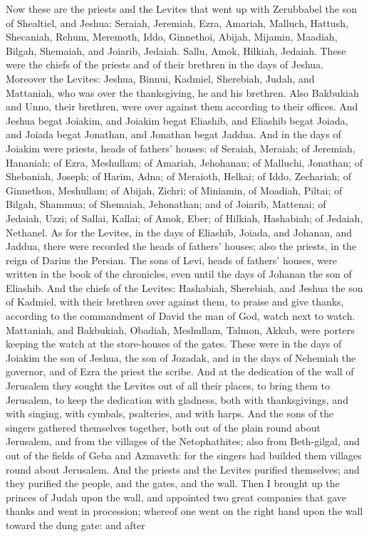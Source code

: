 Now these are the priests and the Levites that went up with Zerubbabel the son of Shealtiel, and Jeshua: Seraiah, Jeremiah, Ezra, Amariah, Malluch, Hattush, Shecaniah, Rehum, Meremoth, Iddo, Ginnethoi, Abijah, Mijamin, Maadiah, Bilgah, Shemaiah, and Joiarib, Jedaiah. Sallu, Amok, Hilkiah, Jedaiah. These were the chiefs of the priests and of their brethren in the days of Jeshua.  Moreover the Levites: Jeshua, Binnui, Kadmiel, Sherebiah, Judah, and Mattaniah, who was over the thanksgiving, he and his brethren. Also Bakbukiah and Unno, their brethren, were over against them according to their offices. And Jeshua begat Joiakim, and Joiakim begat Eliashib, and Eliashib begat Joiada, and Joiada begat Jonathan, and Jonathan begat Jaddua.  And in the days of Joiakim were priests, heads of fathers’ houses: of Seraiah, Meraiah; of Jeremiah, Hananiah; of Ezra, Meshullam; of Amariah, Jehohanan; of Malluchi, Jonathan; of Shebaniah, Joseph; of Harim, Adna; of Meraioth, Helkai; of Iddo, Zechariah; of Ginnethon, Meshullam; of Abijah, Zichri; of Miniamin, of Moadiah, Piltai; of Bilgah, Shammua; of Shemaiah, Jehonathan; and of Joiarib, Mattenai; of Jedaiah, Uzzi; of Sallai, Kallai; of Amok, Eber; of Hilkiah, Hashabiah; of Jedaiah, Nethanel.  As for the Levites, in the days of Eliashib, Joiada, and Johanan, and Jaddua, there were recorded the heads of fathers’ houses; also the priests, in the reign of Darius the Persian. The sons of Levi, heads of fathers’ houses, were written in the book of the chronicles, even until the days of Johanan the son of Eliashib. And the chiefs of the Levites: Hashabiah, Sherebiah, and Jeshua the son of Kadmiel, with their brethren over against them, to praise and give thanks, according to the commandment of David the man of God, watch next to watch. Mattaniah, and Bakbukiah, Obadiah, Meshullam, Talmon, Akkub, were porters keeping the watch at the store-houses of the gates. These were in the days of Joiakim the son of Jeshua, the son of Jozadak, and in the days of Nehemiah the governor, and of Ezra the priest the scribe.  And at the dedication of the wall of Jerusalem they sought the Levites out of all their places, to bring them to Jerusalem, to keep the dedication with gladness, both with thanksgivings, and with singing, with cymbals, psalteries, and with harps. And the sons of the singers gathered themselves together, both out of the plain round about Jerusalem, and from the villages of the Netophathites; also from Beth-gilgal, and out of the fields of Geba and Azmaveth: for the singers had builded them villages round about Jerusalem. And the priests and the Levites purified themselves; and they purified the people, and the gates, and the wall.  Then I brought up the princes of Judah upon the wall, and appointed two great companies that gave thanks and went in procession; whereof one went on the right hand upon the wall toward the dung gate: and after 